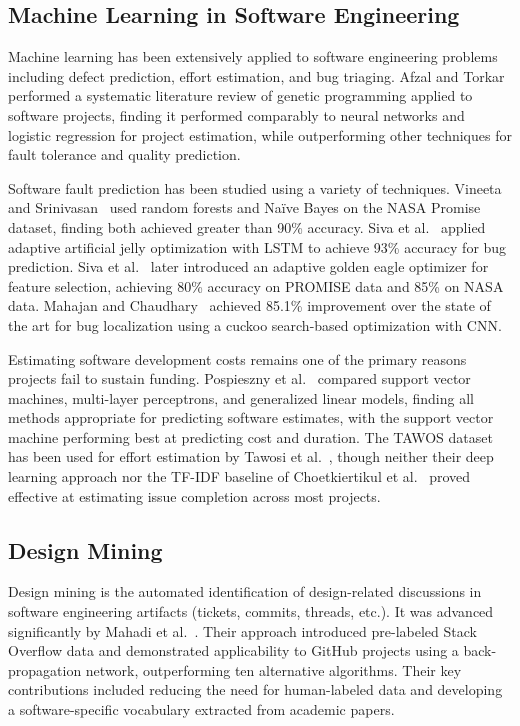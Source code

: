 \documentclass[preprint,12pt]{elsarticle}
\begin{document}
\subsection{Machine Learning in Software Engineering}

Machine learning has been extensively applied to software engineering problems including defect prediction, effort estimation, and bug triaging. Afzal and Torkar~\cite{afzal2011} performed a systematic literature review of genetic programming applied to software projects, finding it performed comparably to neural networks and logistic regression for project estimation, while outperforming other techniques for fault tolerance and quality prediction.

Software fault prediction has been studied using a variety of techniques. Vineeta and Srinivasan~\cite{vineeta2019} used random forests and Na\"ive Bayes on the NASA Promise dataset, finding both achieved greater than 90\% accuracy. Siva et al.~\cite{siva2023a} applied adaptive artificial jelly optimization with LSTM to achieve 93\% accuracy for bug prediction.  Siva et al.~\cite{siva2023b} later introduced an adaptive golden eagle optimizer for feature selection, achieving 80\% accuracy on PROMISE data and 85\% on NASA data. Mahajan and Chaudhary~\cite{mahajan2022} achieved 85.1\% improvement over the state of the art for bug localization using a cuckoo search-based optimization with CNN.

Estimating software development costs remains one of the primary reasons projects fail to sustain funding. Pospieszny et al.~\cite{pospieszny2018} compared support vector machines, multi-layer perceptrons, and generalized linear models, finding all methods appropriate for predicting software estimates, with the support vector machine performing best at predicting cost and duration. The TAWOS dataset has been used for effort estimation by Tawosi et al.~\cite{tawosi2022}, though neither their deep learning approach nor the TF-IDF baseline of Choetkiertikul et al.~\cite{choetkiertikul2019} proved effective at estimating issue completion across most projects.

\subsection{Design Mining}

Design mining is the automated identification of design-related discussions in software engineering artifacts (tickets, commits, threads, etc.). It was advanced significantly by Mahadi et al.~\cite{mahadi2021}. Their approach introduced pre-labeled Stack Overflow data and demonstrated applicability to GitHub projects using a back-propagation network, outperforming ten alternative algorithms. Their key contributions included reducing the need for human-labeled data and developing a software-specific vocabulary extracted from academic papers.
\end{document}
